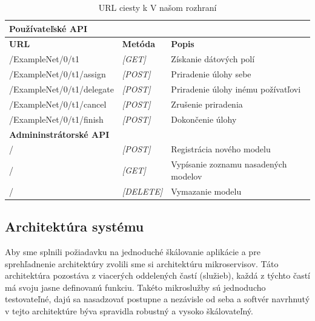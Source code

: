 \begin{table}[]
\begin{tabular}{|l|ll|}
\hline
\textbf{Používateľské API}     &                                            &                                      \\ \hline
\textbf{URL}                   & \multicolumn{1}{l|}{\textbf{Metóda}}       & \textbf{Popis}                       \\ \hline
/ExampleNet/0/t1               & \multicolumn{1}{l|}{\textit{{[}GET{]}}}    & Získanie dátových polí               \\ \hline
/ExampleNet/0/t1/assign        & \multicolumn{1}{l|}{\textit{{[}POST{]}}}   & Priradenie úlohy sebe                \\ \hline
/ExampleNet/0/t1/delegate      & \multicolumn{1}{l|}{\textit{{[}POST{]}}}   & Priradenie úlohy inému požívatľovi   \\ \hline
/ExampleNet/0/t1/cancel        & \multicolumn{1}{l|}{\textit{{[}POST{]}}}   & Zrušenie priradenia                  \\ \hline
/ExampleNet/0/t1/finish        & \multicolumn{1}{l|}{\textit{{[}POST{]}}}   & Dokončenie úlohy                     \\ \hline
\textbf{Admininstrátorské API} & \textit{}                                  &                                      \\ \hline
/                              & \multicolumn{1}{l|}{\textit{{[}POST{]}}}   & Registrácia nového modelu            \\ \hline
/                              & \multicolumn{1}{l|}{\textit{{[}GET{]}}}    & Vypísanie zoznamu nasadených modelov \\ \hline
/                              & \multicolumn{1}{l|}{\textit{{[}DELETE{]}}} & Vymazanie modelu                     \\ \hline
\end{tabular}
\caption{URL ciesty k V našom rozhraní}
\label{urls_table}
\end{table} 

\subsection{Architektúra systému}
Aby sme splnili požiadavku na jednoduché škálovanie aplikácie a pre sprehľadnenie architektúry zvolili sme si architektúru mikroservisov. Táto architektúra pozostáva z viacerých oddelených častí (služieb), každá z týchto častí má svoju jasne definovanú funkciu. Takéto mikroslužby sú jednoducho testovateľné, dajú sa nasadzovať postupne a nezávisle od seba a softvér navrhnutý v tejto architektúre býva spravidla robustný a vysoko škálovateľný.


